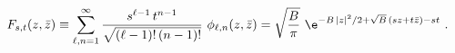 \begin{equation}
F_{s,t}(z,\bar{z})\equiv\sum_{\ell,n=1}^\infty \frac{s^{\ell-1}\,t^{n-1}}
{\sqrt{(\ell-1) !\,(n-1)!}}~\phi_{\ell,n}(z,\bar{z})
=\sqrt{\frac{B}{\pi}}~\e^{-B\,|z|^2/2+\sqrt{B}\,(sz+t\bar{z})-st} \ .
\end{equation}

